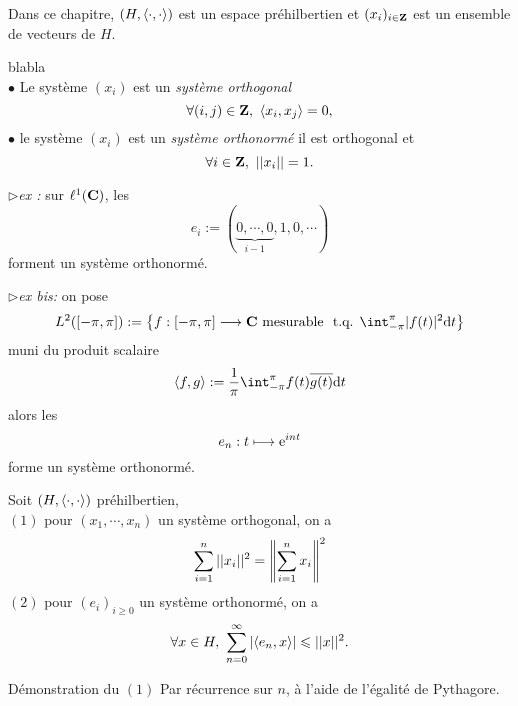 \documentclass[a4paper,11pt, twoside]{article}
\begin{document}


Dans ce chapitre, $(H,\left\langle \cdot,\cdot \right\rangle)$ est un espace préhilbertien et $(x_i)_{i\in\mathbf Z}$ est un ensemble de vecteurs de $H$.



\begin{Def}{\color{white} blabla}\\
  $\bullet$ Le système $(x_i)$ est un \emph{système orthogonal} \ssi 
  $$\forall (i,j)\in\mathbf Z,\ \left\langle x_i,x_j \right\rangle=0,$$
  $\bullet$ le système $(x_i)$ est un \emph{système orthonormé} \ssi il est orthogonal et 
  $$\forall i\in\mathbf Z,\ ||x_i||=1.$$
\end{Def}


$\triangleright$\emph{ex : }sur $\ell^1(\mathbf C)$, les 
$$e_i:=(\underbrace{0,\cdots,0}_{i-1},1,0,\cdots)$$
forment un système orthonormé.


$\triangleright$\emph{ex bis: }on pose 
$$L^2([-\pi,\pi]):=\ens{f:[-\pi,\pi]\longrightarrow\C\text{ mesurable }\tq\dstyle\int_{-\pi}^\pi |f(t)|^2\dt}$$
muni du produit scalaire 
$$\ps{f,g}:=\frac{1}{\pi}\int_{-\pi}^\pi f(t)\overline{g(t)}\dt$$
alors les 
$$e_n:t\longmapsto \mathrm{e}^{int}$$
forme un système orthonormé.



\begin{prop}
  Soit $(H,\left\langle \cdot,\cdot \right\rangle)$ préhilbertien,\\
  $(\mathit 1)$ pour $(x_1,\cdots,x_n)$ un système orthogonal, on a 
  $$\sum_{i=1}^n||x_i||^2=\left\lVert\sum_{i=1}^n x_i\right\rVert^2$$
  $(\mathit 2)$ pour $(e_i)_{i\geqslant 0}$ un système orthonormé, on a 
  $$\forall x\in H,\ \sum_{n=0}^\infty\left| \left\langle e_n,x \right\rangle\right|\leqslant ||x||^2.$$
\end{prop}


\begin{ProofC}{Démonstration du $(\mathit 1)$}
  Par récurrence sur $n$, à l'aide de l'égalité de Pythagore.
\end{ProofC}
\end{document}
